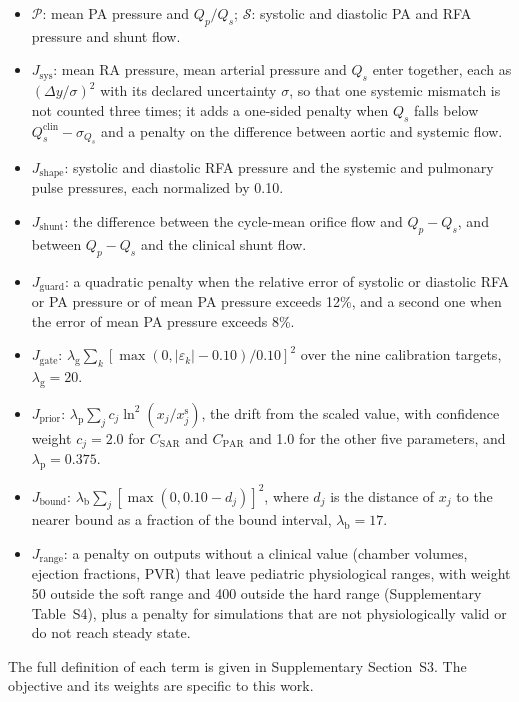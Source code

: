 \begin{itemize}[leftmargin=1.5em,itemsep=1pt]
\item $\mathcal{P}$: mean PA pressure and $Q_p/Q_s$; $\mathcal{S}$: systolic and diastolic PA and RFA pressure and shunt flow.
\item $J_{\mathrm{sys}}$: mean RA pressure, mean arterial pressure and $Q_s$ enter together, each as $(\Delta y/\sigma)^2$ with its declared uncertainty $\sigma$, so that one systemic mismatch is not counted three times; it adds a one-sided penalty when $Q_s$ falls below $Q_s^{\mathrm{clin}} - \sigma_{Q_s}$ and a penalty on the difference between aortic and systemic flow.
\item $J_{\mathrm{shape}}$: systolic and diastolic RFA pressure and the systemic and pulmonary pulse pressures, each normalized by 0.10.
\item $J_{\mathrm{shunt}}$: the difference between the cycle-mean orifice flow and $Q_p - Q_s$, and between $Q_p - Q_s$ and the clinical shunt flow.
\item $J_{\mathrm{guard}}$: a quadratic penalty when the relative error of systolic or diastolic RFA or PA pressure or of mean PA pressure exceeds 12\%, and a second one when the error of mean PA pressure exceeds 8\%.
\item $J_{\mathrm{gate}}$: $\lambda_{\mathrm{g}}\sum_{k}[\max(0,\lvert\varepsilon_k\rvert - 0.10)/0.10]^2$ over the nine calibration targets, $\lambda_{\mathrm{g}} = 20$.
\item $J_{\mathrm{prior}}$: $\lambda_{\mathrm{p}}\sum_{j} c_j \ln^{2}(x_j/x_j^{\mathrm{s}})$, the drift from the scaled value, with confidence weight $c_j = 2.0$ for $C_{\mathrm{SAR}}$ and $C_{\mathrm{PAR}}$ and 1.0 for the other five parameters, and $\lambda_{\mathrm{p}} = 0.375$.
\item $J_{\mathrm{bound}}$: $\lambda_{\mathrm{b}}\sum_{j}[\max(0, 0.10 - d_j)]^2$, where $d_j$ is the distance of $x_j$ to the nearer bound as a fraction of the bound interval, $\lambda_{\mathrm{b}} = 17$.
\item $J_{\mathrm{range}}$: a penalty on outputs without a clinical value (chamber volumes, ejection fractions, PVR) that leave pediatric physiological ranges, with weight 50 outside the soft range and 400 outside the hard range (Supplementary Table~S4), plus a penalty for simulations that are not physiologically valid or do not reach steady state.
\end{itemize}
The full definition of each term is given in Supplementary Section~S3. The objective and its weights are specific to this work.

